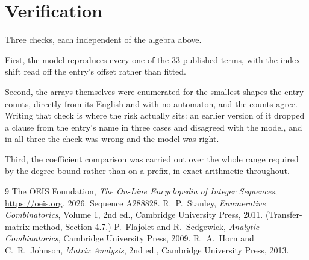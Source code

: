 \documentclass[11pt,a4paper]{article}
\theoremstyle{plain}
\theoremstyle{definition}
\begin{document}
\section{Verification}

Three checks, each independent of the algebra above.

First, the model reproduces every one of the $33$ published terms, with the index shift
read off the entry's offset rather than fitted.

Second, the arrays themselves were enumerated for the smallest shapes the entry counts,
directly from its English and with no automaton, and the counts agree. Writing that check is
where the risk actually sits: an earlier version of it dropped a clause from the entry's name
in three cases and disagreed with the model, and in all three the check was wrong and the model
was right.

Third, the coefficient comparison was carried out over the whole range required by the degree
bound rather than on a prefix, in exact arithmetic throughout.

\begin{thebibliography}{9}
 The OEIS Foundation, \emph{The On-Line Encyclopedia of Integer
Sequences}, \url{https://oeis.org}, 2026. Sequence A288828.
 R.~P.~Stanley, \emph{Enumerative Combinatorics}, Volume 1, 2nd ed.,
Cambridge University Press, 2011. (Transfer-matrix method, Section 4.7.)
 P.~Flajolet and R.~Sedgewick, \emph{Analytic Combinatorics}, Cambridge
University Press, 2009.
 R.~A.~Horn and C.~R.~Johnson, \emph{Matrix Analysis}, 2nd ed., Cambridge
University Press, 2013.
\end{thebibliography}
\end{document}
